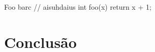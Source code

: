 \documentclass
  [11pt,a4paper,english,brazil,openright,sumario=tradicional,twoside]
  {abntex2}
\begin{document}
  \begin{codesnippet}{Foo bar}{c}
    // aisuhdaius
    int foo(x) {
      return x + 1;
    }
  \end{codesnippet}


  \chapter{Conclusão}


  \postextual
  \printbibliography
\end{document}
